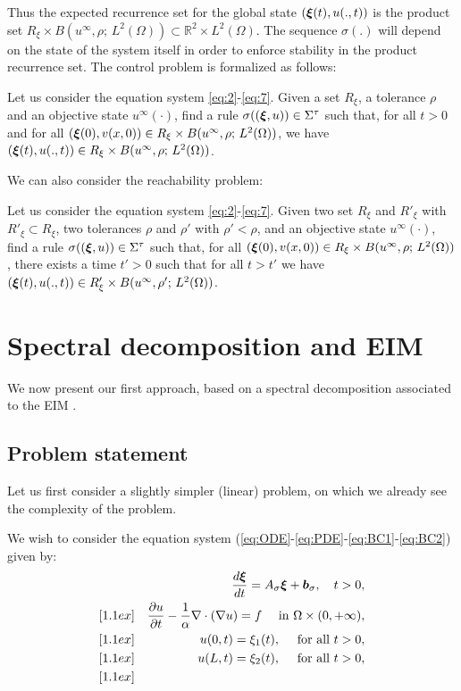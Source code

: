 %
Thus the expected recurrence set for the global state $(\bm{\xi}(t),u(.,t))$
is the product set 
$R_\xi\times B(u^{\infty},\rho;\, L^2(\Omega))\subset \mathbb{R}^2\times L^2(\Omega)$. 
The sequence $\sigma(.)$ will depend on the state of the system itself in order to 
enforce stability in the product recurrence set.
The control problem is formalized as follows:
%
\begin{problem}
 Let us consider the equation system \eqref{eq:2}-\eqref{eq:7}.
 Given a set $R_\xi$, a tolerance $\rho$ and an objective state $u^\infty(\cdot)$,
 find a rule $\sigma((\bm{\xi},u)) \in \Sigma^\tau$ such that, 
 for all $t >0$ and for all $(\bm{\xi} (0),v(x,0))\in R_\xi\times B(u^{\infty},\rho;\, L^2(\Omega))$,
 we have $(\bm{\xi}(t),u(.,t)) \in  R_\xi\times B(u^{\infty},\rho;\, L^2(\Omega))$.
 \label{prob:control} 
\end{problem}
We can also consider the reachability problem:
\begin{problem}
 Let us consider the equation system \eqref{eq:2}-\eqref{eq:7}.
 Given two set $R_\xi$ and $R'_\xi$ with $R'_\xi \subset R_\xi$, two tolerances $\rho$ and $\rho'$
 with $\rho' < \rho$,
 and an objective state $u^\infty(\cdot)$,
 find a rule $\sigma((\bm{\xi},u)) \in \Sigma^\tau$ such that, 
  for all $(\bm{\xi} (0),v(x,0))\in R_\xi\times B(u^{\infty},\rho;\, L^2(\Omega))$,
 there exists a time $t'> 0$ such that for all $t > t'$ we have 
 $(\bm{\xi}(t),u(.,t)) \in  R'_\xi\times B(u^{\infty},\rho';\, L^2(\Omega))$.
 \label{prob:control2} 
\end{problem}

\section{Spectral decomposition and EIM}

We now present our first approach, based on a spectral decomposition 
associated to the EIM \cite{maday2007general}.

\subsection{Problem statement}

Let us first consider a slightly simpler (linear) problem, on which 
we already see the complexity of the problem.

We wish to consider the equation system (\ref{eq:ODE}-\ref{eq:PDE}-\ref{eq:BC1}-\ref{eq:BC2}) 
given by:
\begin{eqnarray}
&& \frac{d\bm{\xi}}{dt} = A_\sigma \bm{\xi} + \bm{b}_\sigma, \quad t>0, \label{eq:ODE} \\ [1.1ex]
&& \frac{\partial u}{\partial t} - \frac{1}{\alpha}\nabla\cdot(\nabla u) = f \quad 
\mbox{ in } \Omega\times (0,+\infty), \label{eq:PDE}\\ [1.1ex]
&& u(0,t) = \xi_1(t), \quad \mbox{ for all } t>0, \label{eq:BC1}\\ [1.1ex]
&& u(L,t) = \xi_2(t), \quad \mbox{ for all } t>0, \label{eq:BC2}\\ [1.1ex]
\end{eqnarray}

